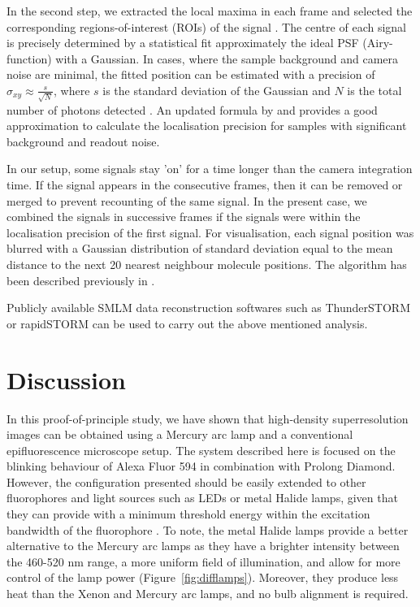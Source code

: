 \documentclass[9pt,twocolumn,twoside]{pnas-new}
\begin{document}
In the second step, we extracted the local maxima in each frame and selected the corresponding regions-of-interest (ROIs) of the signal \citep{grull2011accelerating, prakash2017investigating}. The centre of each signal is precisely determined by a statistical fit approximately the ideal PSF (Airy-function) with a Gaussian. In cases, where the sample background and camera noise are minimal, the fitted position can be estimated with a precision of $\sigma_{xy} \approx \frac{s}{\sqrt N}$, where $s$ is the standard deviation of the Gaussian and $N$ is the total number of photons detected \citep{betzig2006, thompson2002precise}. An updated formula by \citep{mortensen2010optimized} and \citep{stallinga2012effect} provides a good approximation to calculate the localisation precision for samples with significant background and readout noise. 

In our setup, some signals stay 'on' for a time longer than the camera integration time. If the signal appears in the consecutive frames, then it can be removed or merged to prevent recounting of the same signal. In the present case, we combined the signals in successive frames if the signals were within the localisation precision of the first signal. For visualisation, each signal position was blurred with a Gaussian distribution of standard deviation equal to the mean distance to the next 20 nearest neighbour molecule positions. The algorithm has been described previously in  \citep{prakash2015superresolution, kaufmann2012visualization}. 

Publicly available SMLM data reconstruction softwares such as ThunderSTORM \citep{ovesny2014thunderstorm} or rapidSTORM \citep{wolter2012rapidstorm} can be used to carry out the above mentioned analysis. 


\section*{Discussion}

In this proof-of-principle study, we have shown that high-density superresolution images can be obtained using a Mercury arc lamp and a conventional epifluorescence microscope setup. The system described here is focused on the blinking behaviour of Alexa Fluor 594 in combination with Prolong Diamond. However, the configuration presented should be easily extended to other fluorophores and light sources such as LEDs or metal Halide lamps, given that they can provide with a minimum threshold energy within the excitation bandwidth of the fluorophore \citep{lichtman2005fluorescence}.  To note, the metal Halide lamps provide a better alternative to the Mercury arc lamps as they have a brighter intensity between the 460-520 nm range, a  more uniform field of illumination, and allow for more control of the lamp power (Figure~\ref{fig:difflamps}). Moreover, they produce less heat than the Xenon and Mercury arc lamps, and no bulb alignment is required. 
\end{document}

